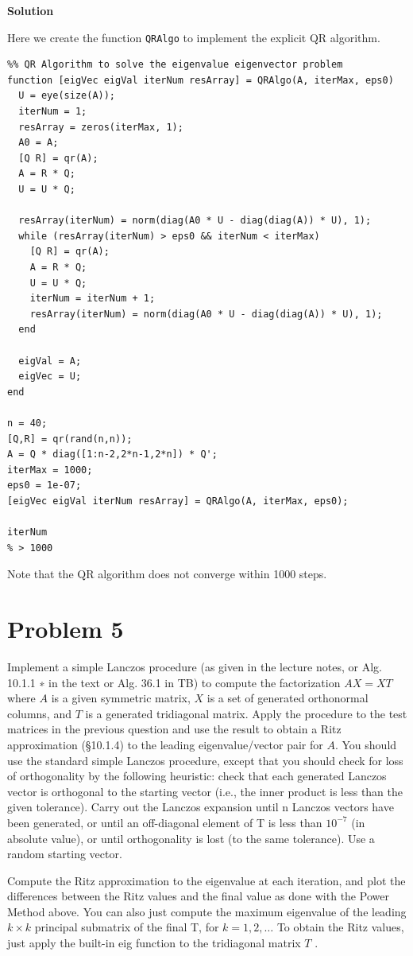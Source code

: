 \documentclass[12pt,oneside,a4paper]{article}
\newcommand{\problem}[1]
{
    \clearpage
    \section*{Problem {#1}}
}
\newcommand{\solution}
{
    \vspace{15pt}
    \noindent\ignorespaces\textbf{\large Solution}\par
}
\newcommand{\m}[1]{\texttt{{#1}}}
\begin{document}
\solution
Here we create the function \m{QRAlgo} to implement the explicit QR algorithm.

\begin{lstlisting}
%% QR Algorithm to solve the eigenvalue eigenvector problem
function [eigVec eigVal iterNum resArray] = QRAlgo(A, iterMax, eps0)
  U = eye(size(A));
  iterNum = 1;
  resArray = zeros(iterMax, 1);
  A0 = A;
  [Q R] = qr(A);
  A = R * Q;
  U = U * Q;

  resArray(iterNum) = norm(diag(A0 * U - diag(diag(A)) * U), 1);
  while (resArray(iterNum) > eps0 && iterNum < iterMax)
    [Q R] = qr(A);
    A = R * Q;
    U = U * Q;    
    iterNum = iterNum + 1;
    resArray(iterNum) = norm(diag(A0 * U - diag(diag(A)) * U), 1);
  end
  
  eigVal = A;
  eigVec = U;
end

n = 40;
[Q,R] = qr(rand(n,n));
A = Q * diag([1:n-2,2*n-1,2*n]) * Q';
iterMax = 1000;
eps0 = 1e-07;
[eigVec eigVal iterNum resArray] = QRAlgo(A, iterMax, eps0);

iterNum
% > 1000 
\end{lstlisting}

Note that the QR algorithm does not converge within 1000 steps.

\problem{5}
Implement a simple Lanczos procedure (as given in the lecture notes, or Alg. 10.1.1 ∗ in the text or Alg. 36.1 in TB) to compute the factorization $AX = XT$ where $A$ is a given symmetric matrix, $X$ is a set of generated orthonormal columns, and $T$ is a generated tridiagonal matrix. Apply the procedure to the test matrices in the previous question and use the result to obtain a Ritz approximation (§10.1.4) to the leading eigenvalue/vector pair for $A$. You should use the standard simple Lanczos procedure, except that you should check for loss of orthogonality by the following heuristic: check that each generated Lanczos vector is orthogonal to the starting vector (i.e., the inner product is less than the given tolerance). Carry out the Lanczos expansion until n Lanczos vectors have been generated, or until an off-diagonal element of T is less than $10^{-7}$ (in absolute value), or until orthogonality is lost (to the same tolerance). Use a random starting vector.

Compute the Ritz approximation to the eigenvalue at each iteration, and plot the differences between the Ritz values and the final value as done with the Power Method above. You can also just compute the maximum eigenvalue of the leading $k \times k$ principal submatrix of the final T, for $k = 1, 2, \dots$ To obtain the Ritz values, just apply the built-in eig function to the tridiagonal matrix $T$ .
\end{document}
